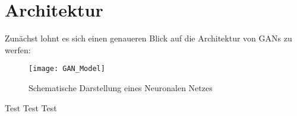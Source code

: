 \section{Architektur}

\noindent Zunächst lohnt es sich einen genaueren Blick auf die Architektur von \acp{GAN} zu werfen: \\

\begin{figure}[h]
    \centering
    \texttt{[image: GAN\_Model]}
    \caption{Schematische Darstellung eines Neuronalen Netzes}
    \label{Abb:basic}
    \end{figure}

    \noindent Test Test Test

\newpage